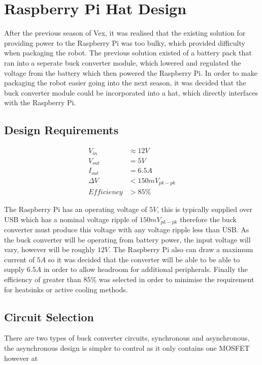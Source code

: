 \newpage


\section{Raspberry Pi Hat Design}
After the previous season of Vex, it was realised that the existing solution for providing power to the Raspberry Pi was too bulky, which provided difficulty when packaging the robot. The previous solution existed of a battery pack that ran into a seperate buck converter module, which lowered and regulated the voltage from the battery which then powered the Raspberry Pi. In order to make packaging the robot easier going into the next season, it was decided that the buck converter module could be incorporated into a hat, which directly interfaces with the Raspberry Pi.

\subsection{Design Requirements}

\begin{align}
    V_{in} &\approx 12V \\
    V_{out} &= 5V \\
    I_{out} &= 6.5A \\
    \Delta V &< 150mV_{pk-pk} \\
    Efficiency &> 85\%
\end{align}

The Raspberry Pi has an operating voltage of $5V$, this is typically supplied over USB which has a nominal voltage ripple of $150mV_{pk-pk}$ therefore the buck converter must produce this voltage with any voltage ripple less than USB. As the buck converter will be operating from battery power, the input voltage will vary, however will be roughly $12V$. The Raspberry Pi also can draw a maximum current of $5A$ so it was decided that the converter will be able to be able to supply $6.5A$ in order to allow headroom for additional peripherals. Finally the efficiency of greater than $85\%$ was selected in order to minimise the requirement for heatsinks or active cooling methods.

\subsection{Circuit Selection}
There are two types of buck converter circuits, synchronous and asynchronous, the asynchronous design is simpler to control as it only contains one MOSFET however at 

